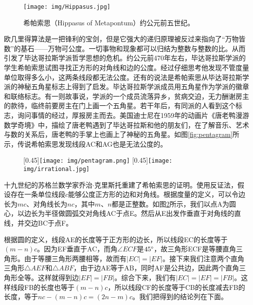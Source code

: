 \documentclass[UTF8]{article}
\begin{document}
\begin{figure}[htbp]
 \centering
 \texttt{[image: img/Hippasus.jpg]}
 \captionsetup{labelformat=empty}
 \caption{希帕索思（Hippasus of Metapontum）约公元前五世纪。}
 \label{fig:Hippasus}
\end{figure}

欧几里得算法是一把锋利的宝剑，但是它强大的递归原理被反过来指向了“万物皆数”的基石——万物可公度。一切事物和现象都可以归结为整数与整数的比。从而引发了毕达哥拉斯学派哲学思想的危机。约公元前470年左右，毕达哥拉斯学派的学生希帕索思试图寻找正方形的对角线和边的公度。经过仔细思考他发现不管度量单位取得多么小，这两条线段都无法公度。还有的说法是希帕索思从毕达哥拉斯学派的神秘五角星标志上得到了启发。毕达哥拉斯学派成员用五角星作为学派的徽章和联络标志。有一则故事说，学派的一个成员流落异乡，贫病交迫，无力酬谢房主的款待，临终前要房主在门上画一个五角星。若干年后，有同派的人看到这个标志，询问事情的经过，厚报房主而去\cite{HanXueTao16}。美国迪士尼在1959年的动画片《唐老鸭漫游数学奇境》中，描绘了唐老鸭遇到了毕达哥拉斯和他的朋友们，在了解音乐、艺术与数的关系后，唐老鸭的手掌上也画上了神秘的五角星。如图\ref{fig:pentagram}所示，传说希帕索思发现线段AC和AG也是无法公度的。


\begin{figure}[htbp]
 \centering
 [0.45\linewidth]{\texttt{[image: img/pentagram.png]}}
 [0.45\linewidth]{\texttt{[image: img/irrational.jpg]}}
 \caption{}
 \label{fig:pentagram}
 \label{fig:irrational}
\end{figure}

十九世纪的苏格兰数学家乔治$\cdot$克里斯托重建了希帕索思的证明。使用反证法，假设存在一条单位线段$c$能够公度正方形的边和对角线。根据度量的定义，可以令边长为$mc$、对角线长为$nc$，其中$m$、$n$都是正整数。如图\ref{fig:irrational}所示，我们以点A为圆心，以边长为半径做圆弧交对角线AC于点E。然后从E出发作垂直于对角线的直线，并交边BC于点F。

根据圆的定义，线段AE的长度等于正方形的边长，所以线段EC的长度等于$(m - n)c$。因为EF垂直于AC，而角$\angle ECF$是$45\degree$，故三角形ECF是等腰直角三角形。由于等腰三角形两腰相等，故而有$|EC| = |EF|$。接下来我们注意两个直角三角形$\triangle AEF$和$\triangle ABF$，由于边AE等于AB，同时AF是公共边，因此两个直角三角形全等。这样就得到边$|EF| = |FB|$。综合下来，我们有$|EC| = |EF| = |FB|$。这样线段FB的长度也等于$(m - n)c$，所以线段CF的长度等于CB的长度减去FB的长度，等于$nc - (m - n)c = (2n - m)c$。我们把得到的结论列在下面。
\end{document}
